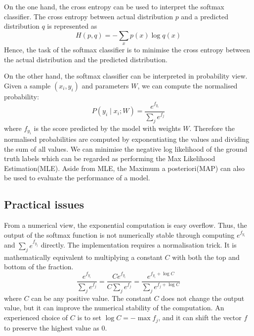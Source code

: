 On the one hand, the cross entropy can be used to interpret the softmax classifier. The cross entropy between actual  distribution $p$ and a predicted distribution $q$ is represented as
\begin{equation}\label{eq:CrossEntropyDiff}
H(p,q) = - \sum_x p(x) \log q(x)
\end{equation}
Hence, the task of the softmax classifier is to minimise the cross entropy between the actual distribution and the predicted distribution. 

On the other hand, the softmax classifier can be interpreted in probability view. Given a sample $(x_i, y_i)$ and parameters $W$, we can compute the normalised probability:
\begin{equation}\label{eq:ProbInter}
P(y_i \mid x_i; W) = \frac{e^{f_{y_i}}}{\sum_j e^{f_j} }
\end{equation}
where $f_{y_i}$ is the score predicted by the model with weights $W$. Therefore the normalised probabilities are computed by exponentiating the values and dividing the sum of all values. We can minimise the negative log likelihood of the ground truth labels which can be regarded as performing the Max Likelihood Estimation(MLE). Aside from MLE, the Maximum a posteriori(MAP) can also be used to evaluate the performance of a model.

\subsection{Practical issues}

From a numerical view, the exponential computation is easy overflow. Thus, the output of the softmax function is not numerically stable through computing $e^{f_{y_i}}$ and $\sum_j e^{f_{y_j}}$ directly. The implementation requires a normalisation trick. It is mathematically equivalent to multiplying a constant $C$ with both the top and bottom of the fraction.
\begin{equation}\label{eq:SoftmaxTricks}
\frac{e^{f_{y_i}}}{\sum_j e^{f_j}}
= \frac{Ce^{f_{y_i}}}{C\sum_j e^{f_j}}
= \frac{e^{f_{y_i} + \log C}}{\sum_j e^{f_j + \log C}}
\end{equation}
where $C$ can be any positive value. The constant $C$ does not change the output value, but it can improve the numerical stability of the computation. An experienced choice of $C$ is to set $\log C = -\max f_j$, and it can shift the vector $f$ to preserve the highest value as $0$.

